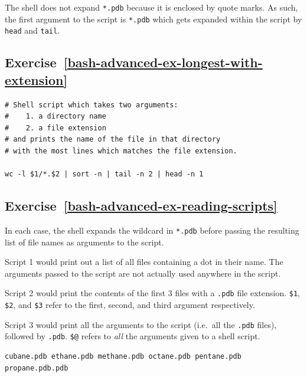 \documentclass[
]{krantz}
\begin{document}
The shell does not expand \texttt{\textquotesingle{}*.pdb\textquotesingle{}} because it is enclosed by quote marks.
As such, the first argument to the script is \texttt{\textquotesingle{}*.pdb\textquotesingle{}} which gets expanded within the
script by \texttt{head} and \texttt{tail}.

\hypertarget{exercise-refbash-advanced-ex-longest-with-extension}{%
\subsection*{Exercise~\ref{bash-advanced-ex-longest-with-extension}}\label{exercise-refbash-advanced-ex-longest-with-extension}}


\begin{verbatim}
# Shell script which takes two arguments:
#    1. a directory name
#    2. a file extension
# and prints the name of the file in that directory
# with the most lines which matches the file extension.

wc -l $1/*.$2 | sort -n | tail -n 2 | head -n 1
\end{verbatim}

\hypertarget{exercise-refbash-advanced-ex-reading-scripts}{%
\subsection*{Exercise~\ref{bash-advanced-ex-reading-scripts}}\label{exercise-refbash-advanced-ex-reading-scripts}}


In each case, the shell expands the wildcard in \texttt{*.pdb} before passing the resulting
list of file names as arguments to the script.

Script 1 would print out a list of all files containing a dot in their name.
The arguments passed to the script are not actually used anywhere in the script.

Script 2 would print the contents of the first 3 files with a \texttt{.pdb} file extension.
\texttt{\$1}, \texttt{\$2}, and \texttt{\$3} refer to the first, second, and third argument respectively.

Script 3 would print all the arguments to the script (i.e.~all the \texttt{.pdb} files),
followed by \texttt{.pdb}.
\texttt{\$@} refers to \emph{all} the arguments given to a shell script.

\begin{verbatim}
cubane.pdb ethane.pdb methane.pdb octane.pdb pentane.pdb propane.pdb.pdb
\end{verbatim}
\end{document}
